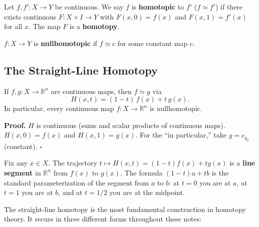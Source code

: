\documentclass[11pt]{report}
\renewenvironment{proof}[1][Proof]{\noindent\textbf{#1.} }{\hfill$\square$\par\vspace{5pt}}
\begin{document}
\begin{defbox}[Homotopy]
Let $f, f': X \to Y$ be continuous. We say $f$ is \textbf{homotopic} to $f'$ ($f \simeq f'$) if there exists continuous $F: X \times I \to Y$ with $F(x, 0) = f(x)$ and $F(x, 1) = f'(x)$ for all $x$. The map $F$ is a \textbf{homotopy}.
\end{defbox}

\begin{defbox}[Nullhomotopic]
$f: X \to Y$ is \textbf{nullhomotopic} if $f \simeq c$ for some constant map $c$.
\end{defbox}

\subsection{The Straight-Line Homotopy}

\begin{thmbox}
If $f, g: X \to \mathbb{R}^n$ are continuous maps, then $f \simeq g$ via
\[H(x, t) = (1 - t)\,f(x) + t\,g(x).\]
In particular, every continuous map $f: X \to \mathbb{R}^n$ is nullhomotopic.
\end{thmbox}

\begin{proof}
$H$ is continuous (sums and scalar products of continuous maps). $H(x, 0) = f(x)$ and $H(x, 1) = g(x)$. For the ``in particular,'' take $g = c_{y_0}$ (constant).
\end{proof}

\begin{rembox}
Fix any $x \in X$. The trajectory $t \mapsto H(x, t) = (1 - t)f(x) + tg(x)$ is a \textbf{line segment} in $\mathbb{R}^n$ from $f(x)$ to $g(x)$. The formula $(1-t)a + tb$ is the standard parameterization of the segment from $a$ to $b$: at $t = 0$ you are at $a$, at $t = 1$ you are at $b$, and at $t = 1/2$ you are at the midpoint.
\end{rembox}

The straight-line homotopy is the most fundamental construction in homotopy theory. It recurs in three different forms throughout these notes:
\end{document}
